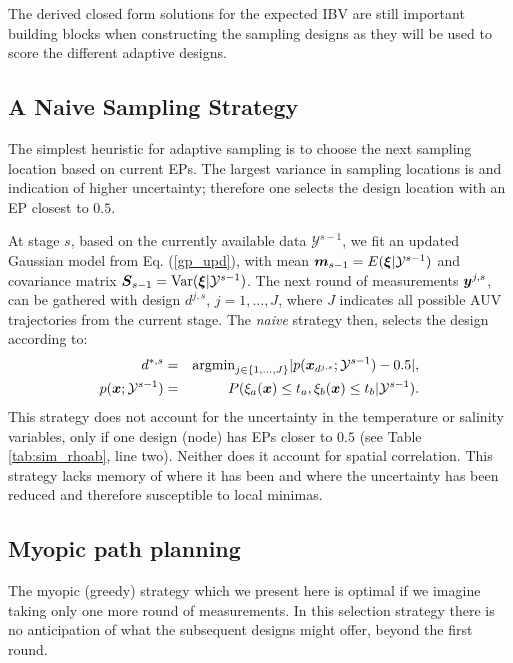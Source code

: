 \documentclass[aoas]{imsart}
\begin{document}
The derived closed form solutions for the expected IBV are still
important building blocks when constructing the sampling designs as
they will be used to score the different adaptive designs. %
 
\subsection{A Naive Sampling Strategy}
\label{naive}

The simplest heuristic for adaptive sampling is to choose the next
sampling location based on current EPs. The largest variance in
sampling locations is and indication of higher uncertainty; therefore
one selects the design location with an EP closest to $0.5$.

At stage $s$, based on the currently available data
$\mathcal{Y}^{s-1}$, we fit an updated Gaussian model from
Eq. (\ref{gp_upd}), with mean ${\boldsymbol m}_{s-1}=E({\boldsymbol \xi}|\mathcal{Y}^{s-1})$
and covariance matrix ${\boldsymbol S}_{s-1}=\mbox{Var}({\boldsymbol \xi}|\mathcal{Y}^{s-1})$.
The next round of measurements ${\boldsymbol y}^{j,s}$, can be gathered with
design $d^{j,s}$, $j=1,\ldots,J$, where $J$ indicates all possible AUV
trajectories from the current stage. The {\it{naive}} strategy then,
selects the design according to:
\begin{eqnarray}\label{critNaive}
    d^{*,s} &=& \mbox{argmin}_{j \in \{1,\ldots,J\}} |p(\bx_{d^{j,s}};\mathcal{Y}^{s-1})-0.5|, \\
    p(\bx;\mathcal{Y}^{s-1}) &=& P(\xi_a(\bx) \leq t_a, \xi_b(\bx) \leq t_b | \mathcal{Y}^{s-1}). \nonumber
\end{eqnarray}
This strategy does not account for the uncertainty in the temperature
or salinity variables, only if one design (node) has EPs closer to
$0.5$ (see Table \ref{tab:sim_rhoab}, line two). Neither does it
account for spatial correlation. This strategy lacks memory of where
it has been and where the uncertainty has been reduced and therefore
susceptible to local minimas.

\subsection{Myopic path planning}
\label{myopic}

The myopic (greedy) strategy which we present here is optimal if we
imagine taking only one more round of measurements. In this selection
strategy there is no anticipation of what the subsequent designs might
offer, beyond the first round.
\end{document}
